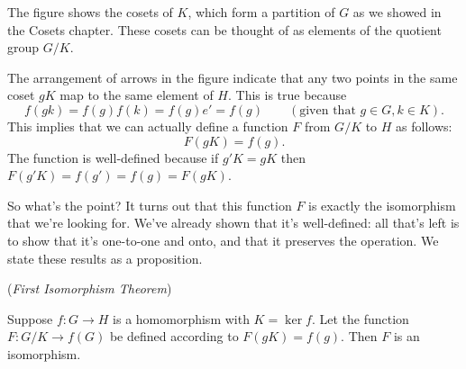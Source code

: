 The figure shows the cosets of $K$, which form a partition of $G$ as we showed in the Cosets chapter. These cosets can be thought of as elements of the quotient group $G/K$. 

The arrangement of arrows in the figure indicate that any two points in the same coset $gK$ map to the same element of $H$.  
This is true because
\[ f(gk) = f(g)f(k) = f(g)e' = f(g)\qquad (\text{given that } g \in G, k \in K).\]
This implies that we can actually define a function $F$ from $G/K$ to $H$ as follows:
\[ F(gK) = f(g). \]
The function is well-defined because if $g'K = gK$ then $F(g'K) = f(g') = f(g) = F(gK)$.
 
So what's the point? It turns out that this function $F$ is exactly the isomorphism that we're looking for. We've already shown that it's well-defined: all that's left is to show that it's one-to-one and onto, and that it preserves the operation. We state these results as a proposition.

%  
%
%
%
%
% 
  
\begin{prop}\label{proposition:homomorph:FirstIsoTheorem}(\emph{First Isomorphism Theorem})

Suppose $f : G \rightarrow H$ is a homomorphism with $K =\ker
f$. Let the function $F: G/K \rightarrow f(G)$
 be defined according to $F(gK) = f(g)$. Then $F$ is an isomorphism. 
\end{prop}
 
